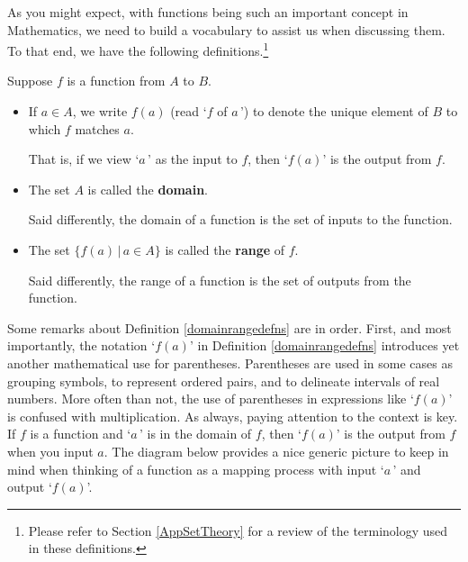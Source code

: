 \documentclass{ximera}
\begin{document}
As you might expect, with functions being such an important concept in Mathematics, we need to build a vocabulary to assist us when discussing them.  To that end, we have the following definitions.\footnote{Please refer to Section \ref{AppSetTheory} for a review of the terminology used in these definitions.}



\begin{definition}\label{domainrangedefns}


Suppose $f$ is a function from $A$ to $B$.

\begin{itemize}

\item If $a \in A$, we write $f(a)$ (read `$f$ of $a\, $') to denote the unique element of $B$ to which $f$ matches $a$.  

That is, if we view `$a\,$' as the input to $f$, then `$f(a)$' is the output from $f$.

\item  The set $A$ is called the  \textbf{domain}.  

Said differently, the domain of a function is the set of inputs to the function.

\item  The set $\{ f(a) \, | \, a \in A \}$ is called the    \textbf{range} of $f$. 

Said differently, the range of a function is the set of outputs from the function.

\end{itemize}


\end{definition}

Some remarks about Definition \ref{domainrangedefns} are in order.  First, and most importantly, the notation `$f(a)$' in Definition \ref{domainrangedefns}  introduces yet another mathematical use for parentheses.  Parentheses are used in some cases as grouping symbols, to represent ordered pairs, and to delineate intervals of real numbers.  More often than not, the use of parentheses in expressions like `$f(a)$' is confused with multiplication.   As always, paying attention to the context is key.  If $f$ is a function and `$a\,$' is in the domain of $f$, then `$f(a)$'  is the output from $f$ when you input $a$.  The diagram below provides a nice generic picture to keep in mind when thinking of a function as a mapping process with input `$a\,$' and output `$f(a)$'.
\end{document}

